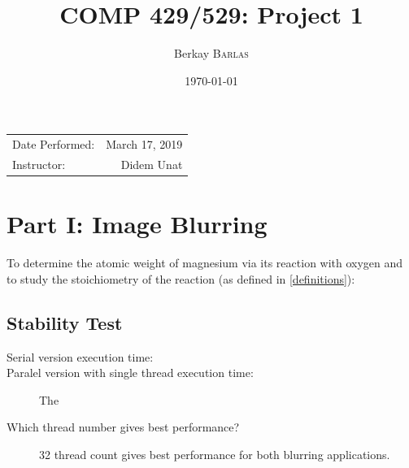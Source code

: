 \documentclass{article}
\title{COMP 429/529: Project 1} %
\author{Berkay \textsc{Barlas}} %
\date{\today} %
\begin{document}
\maketitle %

\begin{center}
\begin{tabular}{l r}
Date Performed: & March 17, 2019 \\ %
Instructor: & Didem Unat %
\end{tabular}
\end{center}



\section{Part I: Image Blurring}

To determine the atomic weight of magnesium via its reaction with oxygen and to study the stoichiometry of the reaction (as defined in \ref{definitions}):



\subsection{Stability Test}

\begin{description}
    \item[Serial version execution time: ] 
    \item[Paralel version with single thread execution time: ]
    The
    \item[Which thread number gives best performance?]
    32 thread count gives best performance for both blurring applications.
\end{description}
\end{document}
